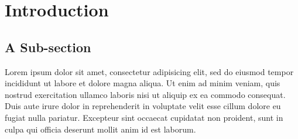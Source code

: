 \section{Introduction}
\label{sec:introduction}

\subsection{A Sub-section}

Lorem ipsum dolor sit amet, consectetur adipisicing elit, sed do eiusmod tempor
incididunt ut labore et dolore magna aliqua. Ut enim ad minim veniam, quis
nostrud exercitation ullamco laboris nisi ut aliquip ex ea commodo consequat.
Duis aute irure dolor in reprehenderit in voluptate velit esse cillum dolore
eu fugiat nulla pariatur. Excepteur sint occaecat cupidatat non proident, sunt
in culpa qui officia deserunt mollit anim id est laborum.


